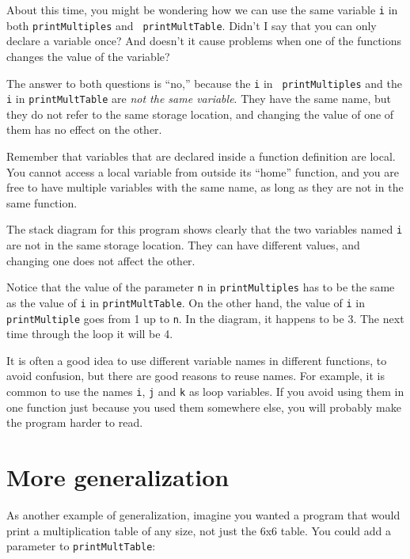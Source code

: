 About this time, you might be wondering how we can use the same
variable {\tt i} in both {\tt printMultiples} and {\tt
printMultTable}.  Didn't I say that you can only declare a variable
once?  And doesn't it cause problems when one of the functions changes
the value of the variable?

The answer to both questions is ``no,'' because the {\tt i} in {\tt
printMultiples} and the {\tt i} in {\tt printMultTable} are
{\em not the same variable}.  They have the same name, but
they do not refer to the same storage location, and changing
the value of one of them has no effect on the other.


Remember that variables that are declared inside a function definition
are local.  You cannot access a local variable from outside its
``home'' function, and you are free to have multiple variables with
the same name, as long as they are not in the same function.

The stack diagram for this program shows clearly that the
two variables named {\tt i} are not in the same storage location.
They can have different values, and changing one does not affect
the other.

\vspace{0.1in}
\centerline{}
\vspace{0.1in}
%
Notice that the value of the parameter {\tt n} in
{\tt printMultiples} has to be the same as the value
of {\tt i} in {\tt printMultTable}.  On the other hand,
the value of {\tt i} in {\tt printMultiple} goes
from 1 up to {\tt n}.  In the diagram, it happens to be 3.
The next time through the loop it will be 4.

It is often a good idea to use different variable names in
different functions, to avoid confusion, but there are good
reasons to reuse names.  For example, it is common to
use the names {\tt i}, {\tt j} and {\tt k} as loop variables.
If you avoid using them in one function just because you
used them somewhere else, you will probably make the program
harder to read.


\section{More generalization}

As another example of generalization, imagine you wanted
a program that would print a multiplication table of any
size, not just the 6x6 table.  You could add a parameter to
{\tt printMultTable}:


